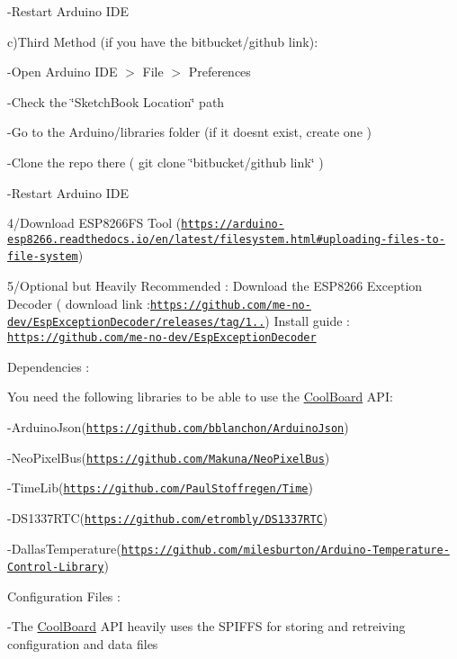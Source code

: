 -\/\+Restart Arduino I\+DE

c)Third Method (if you have the bitbucket/github link)\+:

-\/\+Open Arduino I\+DE $>$ File $>$ Preferences

-\/\+Check the \char`\"{}\+Sketch\+Book Location\char`\"{} path

-\/\+Go to the Arduino/libraries folder (if it doesn\textquotesingle{}t exist, create one )

-\/\+Clone the repo there ( git clone \char`\"{}bitbucket/github link\char`\"{} )

-\/\+Restart Arduino I\+DE

4/\+Download E\+S\+P8266\+FS Tool (\href{https://arduino-esp8266.readthedocs.io/en/latest/filesystem.html#uploading-files-to-file-system}{\tt https\+://arduino-\/esp8266.\+readthedocs.\+io/en/latest/filesystem.\+html\#uploading-\/files-\/to-\/file-\/system})

5/\+Optional but Heavily Recommended \+: Download the E\+S\+P8266 Exception Decoder ( download link \+:\href{https://github.com/me-no-dev/EspExceptionDecoder/releases/tag/1.0.6}{\tt https\+://github.\+com/me-\/no-\/dev/\+Esp\+Exception\+Decoder/releases/tag/1..}) Install guide \+: \href{https://github.com/me-no-dev/EspExceptionDecoder}{\tt https\+://github.\+com/me-\/no-\/dev/\+Esp\+Exception\+Decoder}

Dependencies \+:

You need the following libraries to be able to use the \hyperlink{class_cool_board}{Cool\+Board} A\+PI\+:

-\/\+Arduino\+Json(\href{https://github.com/bblanchon/ArduinoJson}{\tt https\+://github.\+com/bblanchon/\+Arduino\+Json})

-\/\+Neo\+Pixel\+Bus(\href{https://github.com/Makuna/NeoPixelBus}{\tt https\+://github.\+com/\+Makuna/\+Neo\+Pixel\+Bus})

-\/\+Time\+Lib(\href{https://github.com/PaulStoffregen/Time}{\tt https\+://github.\+com/\+Paul\+Stoffregen/\+Time})

-\/\+D\+S1337\+R\+TC(\href{https://github.com/etrombly/DS1337RTC}{\tt https\+://github.\+com/etrombly/\+D\+S1337\+R\+TC})

-\/\+Dallas\+Temperature(\href{https://github.com/milesburton/Arduino-Temperature-Control-Library}{\tt https\+://github.\+com/milesburton/\+Arduino-\/\+Temperature-\/\+Control-\/\+Library})

Configuration Files \+:

-\/\+The \hyperlink{class_cool_board}{Cool\+Board} A\+PI heavily uses the S\+P\+I\+F\+FS for storing and retreiving configuration and data files

